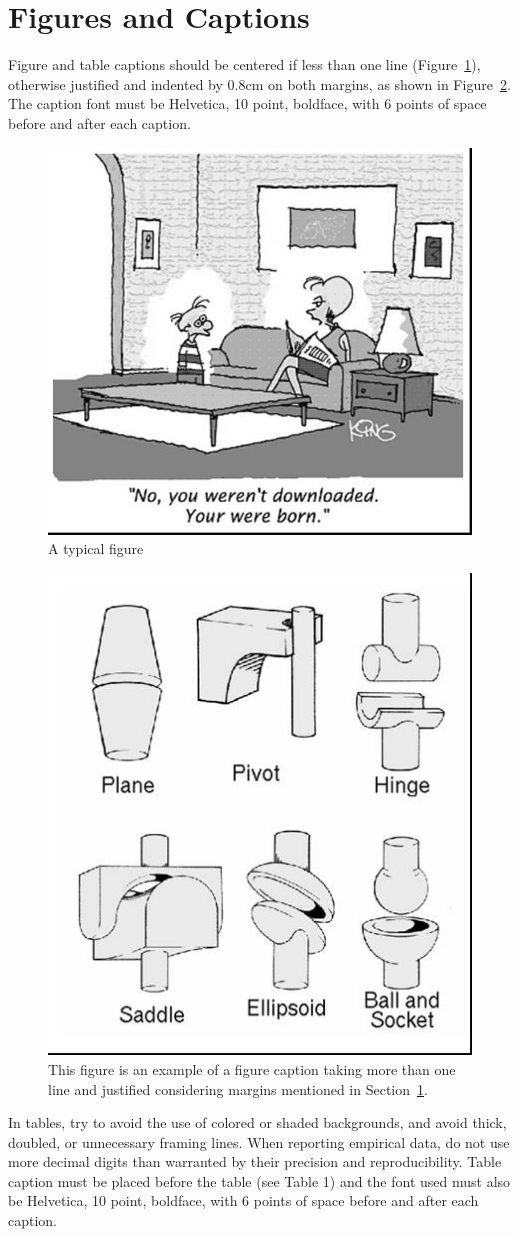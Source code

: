 \documentclass[12pt]{article}
\begin{document}
\section{Figures and Captions}\label{sec:figs}

Figure and table captions should be centered if less than one line
(Figure~\ref{fig:exampleFig1}), otherwise justified and indented by 0.8cm on
both margins, as shown in Figure~\ref{fig:exampleFig2}. The caption font must
be Helvetica, 10 point, boldface, with 6 points of space before and after each
caption.

\begin{figure}[ht]
\centering
\includegraphics[width=.5\textwidth]{fig1.jpg}
\caption{A typical figure}
\label{fig:exampleFig1}
\end{figure}

\begin{figure}[ht]
\centering
\includegraphics[width=.3\textwidth]{fig2.jpg}
\caption{This figure is an example of a figure caption taking more than one
  line and justified considering margins mentioned in Section~\ref{sec:figs}.}
\label{fig:exampleFig2}
\end{figure}

In tables, try to avoid the use of colored or shaded backgrounds, and avoid
thick, doubled, or unnecessary framing lines. When reporting empirical data,
do not use more decimal digits than warranted by their precision and
reproducibility. Table caption must be placed before the table (see Table 1)
and the font used must also be Helvetica, 10 point, boldface, with 6 points of
space before and after each caption.
\end{document}
